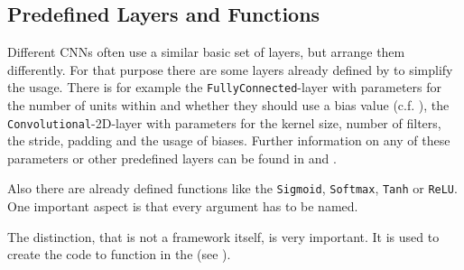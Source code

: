 
\subsection{Predefined Layers and Functions} \label{subsec: CNNArchLang - predefines layers}
Different CNNs often use a similar basic set of layers, but arrange them differently. For that purpose there are some layers already defined by \cnnarch to simplify the usage.
There is for example the \texttt{FullyConnected}-layer with parameters for the number of units within and whether they should use a bias value (c.f. ), the \texttt{Convolutional}-2D-layer with parameters for the kernel size, number of filters, the stride, padding and the usage of biases. Further information on any of these parameters or other predefined layers can be found in  and \cite{CNNArch}.

Also there are already defined functions like the \texttt{Sigmoid}, \texttt{Softmax}, \texttt{Tanh} or \texttt{ReLU}. 
One important aspect is that every argument has to be named. 

The distinction, that \cnnarch is not a framework itself, is very important. It is used to create the code to function in the \mxnet (see ).

